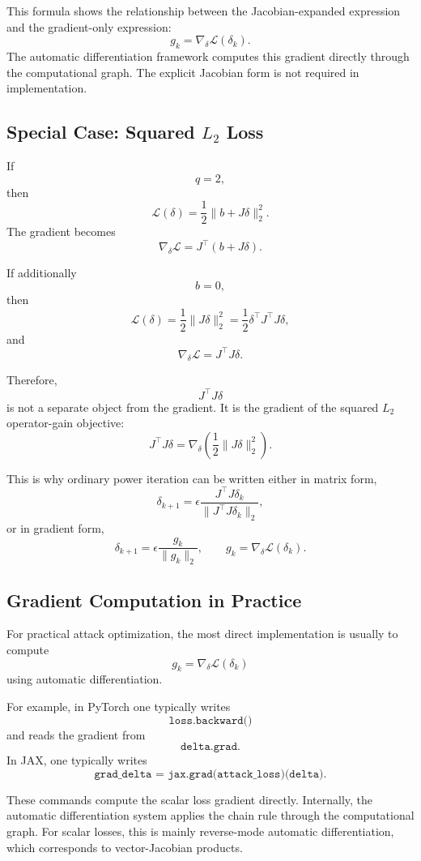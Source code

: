 \documentclass{article}
\begin{document}
This formula shows the relationship between the Jacobian-expanded expression and the gradient-only expression:
\[
g_k
=
\nabla_\delta \mathcal L(\delta_k).
\]
The automatic differentiation framework computes this gradient directly through the computational graph. The explicit Jacobian form is not required in implementation.

\subsection{Special Case: Squared $L_2$ Loss}

If
\[
q=2,
\]
then
\[
\mathcal L(\delta)
=
\frac12\|b+J\delta\|_2^2.
\]
The gradient becomes
\[
\nabla_\delta \mathcal L
=
J^\top(b+J\delta).
\]

If additionally
\[
b=0,
\]
then
\[
\mathcal L(\delta)
=
\frac12\|J\delta\|_2^2
=
\frac12\delta^\top J^\top J\delta,
\]
and
\[
\nabla_\delta \mathcal L
=
J^\top J\delta.
\]

Therefore,
\[
J^\top J\delta
\]
is not a separate object from the gradient. It is the gradient of the squared $L_2$ operator-gain objective:
\[
\boxed{
J^\top J\delta
=
\nabla_\delta
\left(
\frac12\|J\delta\|_2^2
\right).
}
\]

This is why ordinary power iteration can be written either in matrix form,
\[
\delta_{k+1}
=
\epsilon
\frac{J^\top J\delta_k}
{\|J^\top J\delta_k\|_2},
\]
or in gradient form,
\[
\delta_{k+1}
=
\epsilon
\frac{g_k}{\|g_k\|_2},
\qquad
g_k=\nabla_\delta \mathcal L(\delta_k).
\]

\subsection{Gradient Computation in Practice}

For practical attack optimization, the most direct implementation is usually to compute
\[
g_k=\nabla_\delta \mathcal L(\delta_k)
\]
using automatic differentiation.

For example, in PyTorch one typically writes
\[
\texttt{loss.backward()}
\]
and reads the gradient from
\[
\texttt{delta.grad}.
\]
In JAX, one typically writes
\[
\texttt{grad\_delta = jax.grad(attack\_loss)(delta)}.
\]

These commands compute the scalar loss gradient directly. Internally, the automatic differentiation system applies the chain rule through the computational graph. For scalar losses, this is mainly reverse-mode automatic differentiation, which corresponds to vector-Jacobian products.
\end{document}
